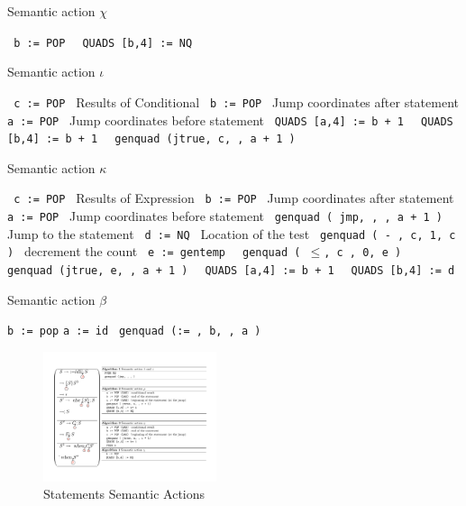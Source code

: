 \documentclass[11pt]{article}
\begin{document}
\begin {algorithm}
\caption{ Semantic action $\chi$ }
\label{alg:lambda3}
\begin{algorithmic}
\STATE \texttt { b :=  POP }
\STATE \texttt { QUADS [b,4] := NQ }
\end{algorithmic}
\end{algorithm}

\begin {algorithm}
\caption{ Semantic action $\iota$ }
\label{alg:lambda3}
\begin{algorithmic}
\STATE \texttt { c := POP } Results of Conditional
\STATE \texttt { b := POP } Jump coordinates after statement
\STATE \texttt { a := POP } Jump coordinates before statement
\STATE \texttt { QUADS [a,4] := b + 1 }
\STATE \texttt { QUADS [b,4] := b + 1 }
\STATE \texttt { genquad (jtrue, c, , a + 1 )  }
\end{algorithmic}
\end{algorithm}

\begin {algorithm}
\caption{ Semantic action $\kappa$ }
\label{alg:lambda3}
\begin{algorithmic}
\STATE \texttt { c := POP } Results of Expression
\STATE \texttt { b := POP } Jump coordinates after statement
\STATE \texttt { a := POP } Jump coordinates before statement
\STATE \texttt { genquad ( jmp, , , a + 1 ) }   Jump to the statement
\STATE \texttt { d := NQ }  Location of the test
\STATE \texttt { genquad ( - , c, 1, c ) }   decrement the count
\STATE \texttt { e := gentemp }
\STATE \texttt { genquad ( $\le$, c , 0, e ) } 
\STATE \texttt { genquad (jtrue, e, , a + 1 )  }
\STATE \texttt { QUADS [a,4] := b + 1 }
\STATE \texttt { QUADS [b,4] := d  }
\end{algorithmic}
\end{algorithm}

\begin {algorithm}
\caption{ Semantic action $\beta$ }
\label{alg:lambda0}
\begin{algorithmic}
\STATE \texttt {b := pop}
\STATE \texttt {a := id }
\STATE \texttt {genquad (:= , b, , a ) }
\end{algorithmic}
\end{algorithm}

\begin{figure}[htbp] %
   \centering
   \includegraphics[width=2in]{statementsA.pdf} 
   \caption{Statements Semantic Actions}
   \label{fig:example}
\end{figure}
\end{document}
